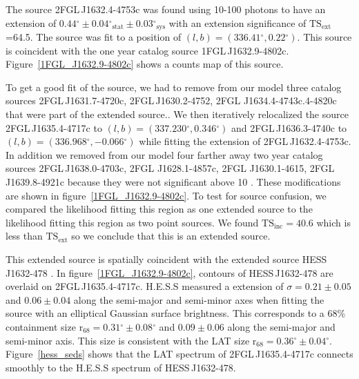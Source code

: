 \documentclass[12pt,preprint]{aastex}
\newcommand{\gev}{\text{GeV}\xspace}
\newcommand{\tev}{\text{TeV}\xspace}
\newcommand{\tsext}{{\ensuremath{\text{TS}_{\text{ext}}}}\xspace}
\newcommand{\tsinc}{\ensuremath{\text{TS}_{\text{inc}}}\xspace}
\newcommand{\rsixeight}{{\ensuremath{\text{r}_{68}}}\xspace}
\newcommand{\sys}{\text{sys}\xspace}
\newcommand{\stat}{\text{stat}\xspace}
\renewcommand{\deg}{\ensuremath{^\circ}\xspace}
\begin{document}
The source 2FGL\,J1632.4-4753c was found 
using 10-100 \gev photons to
have an extension of $0.44\deg\pm0.04\deg_\stat\pm0.03\deg_\sys$ 
with an extension
significance of \tsext=64.5.  The source was fit to a position of
$(l,b)=(336.41\deg,0.22\deg)$.  This source is coincident with the one
year catalog source 1FGL\,J1632.9-4802c.  Figure~\ref{1FGL_J1632.9-4802c}
shows a counts map of this source.

To get a good fit of the source, we had to remove from our model
three catalog sources 2FGL\,J1631.7-4720c, 2FGL\,J1630.2-4752,
2FGL J1634.4-4743c.4-4820c that were part of the extended source..
We then iteratively relocalized the source 2FGL\,J1635.4-4717c
to $(l,b)=(337.230\deg,0.346\deg)$ and 2FGL\,J1636.3-4740c to
$(l,b)=(336.968\deg,-0.066\deg)$ while fitting the extension of
2FGL\,J1632.4-4753c.  In addition we removed from our model four
farther away two year catalog sources 2FGL\,J1638.0-4703c, 2FGL
J1628.1-4857c, 2FGL  J1630.1-4615, 2FGL\,J1639.8-4921c because they
were not significant above 10 \gev.  These modifications are shown
in figure~\ref{1FGL_J1632.9-4802c}.  To test for source confusion,
we compared the likelihood fitting this region as one extended source
to the likelihood fitting this region as two point sources. We found
$\tsinc=40.6$ which is less than \tsext so we conclude
that this is an extended source.

This extended source is spatially coincident with the extended
\tev source HESS\,J1632-478 \citep{hess_plane_survey}.
In figure~\ref{1FGL_J1632.9-4802c}, contours of  HESS\,J1632-478
are overlaid on 2FGL\,J1635.4-4717c.  H.E.S.S measured a 
extension of $\sigma=0.21\pm0.05$ and $0.06\pm0.04$ along the
semi-major and semi-minor axes when fitting the source with an
elliptical Gaussian surface brightness.  This corresponds to a 68\%
containment size $\rsixeight=0.31\deg\pm0.08\deg$ and $0.09\pm0.06$
along the semi-major and semi-minor axis. This size is consistent with
the LAT size $\rsixeight=0.36\deg\pm0.04\deg$.  Figure~\ref{hess_seds}
shows that the LAT spectrum of 2FGL\,J1635.4-4717c connects smoothly to
the H.E.S.S spectrum of HESS\,J1632-478.
\end{document}
